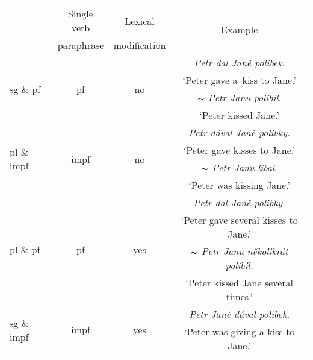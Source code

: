 \documentclass[output=paper
,modfonts
,nonflat]{langsci/langscibook}
\begin{document}
\begin{table}[tb]
	\centering
	\begin{tabular}{lccc}
	 \lsptoprule
	   \multirow{2}{*}{LVC} & Single verb & Lexical        & \multirow{2}{*}{Example} \\
	                     & paraphrase &  modification   &   \\ \midrule
		\multirow{4}{*}{sg \& pf}   & \multirow{4}{*}{pf} &  \multirow{4}{*}{no} &  \textit{Petr dal Janě polibek}. \\ 
		                            &                     &                      &  `Peter gave a~kiss to Jane.' \\
		                            &                     &                      &   $\thicksim$ \textit{Petr Janu políbil}. \\
		                            &                     &                      &   `Peter kissed Jane.'\\ \hline
 		\multirow{4}{*}{pl \& impf} & \multirow{4}{*}{impf} & \multirow{4}{*}{no}     &  \textit{Petr dával Janě polibky.} \\
 		                            &                       &                         & `Peter gave kisses to Jane.' \\ 
                                  &                       &                         & $\thicksim$ \textit{Petr Janu líbal}. \\
                                  &                       &                         & `Peter was kissing Jane.' \\ \hline  		                                                                                  
		\multirow{4}{*}{pl \& pf}  & \multirow{4}{*}{pf}  & \multirow{4}{*}{yes}    &    \textit{Petr dal Janě polibky}. \\
		                            &                       &                        &    `Peter gave several kisses to Jane.' \\ 
                                  &                       &                        &     $\thicksim$ \textit{Petr Janu několikrát políbil.} \\
                                  &                       &                        &     `Peter kissed Jane several times.' \\ \hline
		\multirow{4}{*}{sg \& impf} & \multirow{4}{*}{impf}   & \multirow{4}{*}{yes}  &   \textit{Petr Janě dával polibek.} \\
		                            &                       &                       &   `Peter was giving a kiss to Jane.' \\ 

\end{tabular}
\end{table}
\end{document}
